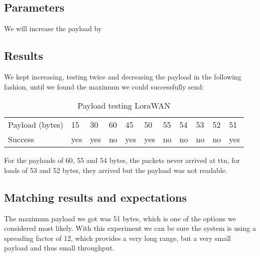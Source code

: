 	\subsection{Parameters}
		We will increase the payload by 
	\subsection{Results}
		We kept increasing, testing twice and decreasing the payload in the following fashion, until we found the maximum we could successfully send:

		\begin{table}[h]
			\begin{tabular}{@{}lllllllllll@{}}
				Payload (bytes) & 15  & 30  & 60 & 45  & 50  & 55 & 54 & 53 & 52 & 51  \\
				Success & yes & yes & no & yes & yes & no & no & no & no & yes
			\end{tabular}
			\caption[Payload testing LoraWAN]{Payload testing LoraWAN}
			\label{tab:LoraWanPayload}
		\end{table}

		For the payloads of 60, 55 and 54 bytes, the packets never arrived at ttn, for loads of 53 and 52 bytes, they arrived but the payload was not readable.

	\subsection{Matching results and expectations}
		The maximum payload we got was 51 bytes, which is one of the options we considered most likely. With this experiment we can be sure the system is using a spreading factor of 12, which provides a very long range, but a very small payload and thus small throughput.

